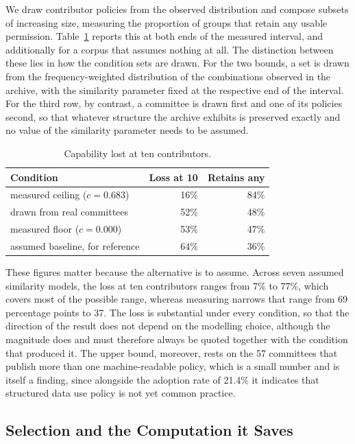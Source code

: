\documentclass[sigconf,anonymous,review]{acmart}
\begin{document}
We draw contributor policies from the observed distribution and compose subsets of
increasing size, measuring the proportion of groups that retain any usable
permission. Table~\ref{tab:erosion} reports this at both ends of the measured
interval, and additionally for a corpus that assumes nothing at all. The
distinction between these lies in how the condition sets are drawn. For the two
bounds, a set is drawn from the frequency-weighted distribution of the
combinations observed in the archive, with the similarity parameter fixed at the
respective end of the interval. For the third row, by contrast, a committee is
drawn first and one of its policies second, so that whatever structure the
archive exhibits is preserved exactly and no value of the similarity parameter
needs to be assumed.

\begin{table}[h]
\caption{Capability lost at ten contributors.}
\label{tab:erosion}
\begin{tabular}{lrr}
\toprule
Condition & Loss at 10 & Retains any \\
\midrule
measured ceiling ($c=0.683$) & 16\% & 84\% \\
drawn from real committees & 52\% & 48\% \\
measured floor ($c=0.000$) & 53\% & 47\% \\
\midrule
assumed baseline, for reference & 64\% & 36\% \\
\bottomrule
\end{tabular}
\end{table}

These figures matter because the alternative is to assume. Across seven assumed
similarity models, the loss at ten contributors ranges from 7\% to 77\%, which
covers most of the possible range, whereas measuring narrows that range from 69
percentage points to 37. The loss is substantial under every condition, so that
the direction of the result does not depend on the modelling choice, although the
magnitude does and must therefore always be quoted together with the condition
that produced it. The upper bound, moreover, rests on the 57 committees that
publish more than one machine-readable policy, which is a small number and is
itself a finding, since alongside the adoption rate of 21.4\% it indicates that
structured data use policy is not yet common practice.

\subsection{Selection and the Computation it Saves}
\label{sec:saving}
\end{document}
